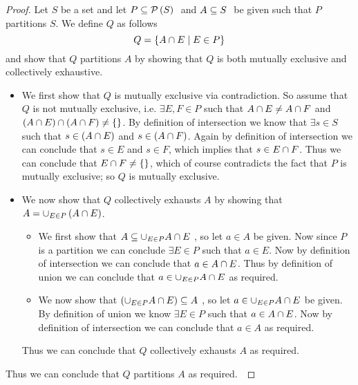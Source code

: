         \begin{proof}
            Let $S$ be a set and let $P \subseteq \mathcal{P}\left(S\right) \ $ and $A \subseteq S \ $ be given such
            that $P$ partitions $S$. We define $Q$ as follows
            \[
                Q = \left\{A \cap E \mid E \in P\right\}
            \]
            and show that $Q$ partitions $A$ by showing that $Q$ is both mutually exclusive
            and collectively exhaustive.
            \begin{itemize}
                \item
                    We first show that $Q$ is mutually exclusive via contradiction.
                    So assume that $Q$ is not mutually exclusive, i.e. $\exists E, F \in P$
                    such that $A \cap E \neq A \cap F$ and 
                    $\left(A \cap E\right) \cap \left(A \cap F\right) \neq \left\{\right\}$.
                    By definition of intersection we know that $\exists s \in S$ such that
                    $s \in \left(A \cap E\right)$ and $s \in \left(A \cap F\right)$. Again by definition 
                    of intersection we can conclude that $s \in E$ and $s \in F$, which implies
                    that $s \in E \cap F$. Thus we can conclude that $E \cap F \neq \left\{\right\}$,
                    which of course contradicts the fact that $P$ is mutually exclusive; so $Q$
                    is mutually exclusive.
                \item
                    We now show that $Q$ collectively exhausts $A$ by showing that
                    $A = \cup_{E \in P} \left(A \cap E\right)$.
                    \begin{itemize}
                        \item
                            We first show that $A \subseteq \cup_{E \in P} A \cap E \ $, so let
                            $a \in A$ be given. Now since $P$ is a partition we can conclude
                            $\exists E \in P$ such that $a \in E$. Now by definition of intersection    
                            we can conclude that $a \in A \cap E$. Thus by definition of
                            union we can conclude that $a \in \cup_{E \in P} A \cap E$ as
                            required.
                        \item
                            We now show that $\left(\cup_{E \in P} A \cap E\right) \subseteq A \ $, so let
                            $a \in \cup_{E \in P} A \cap E$ be given. By definition of union
                            we know $\exists E \in P$ such that $a \in A \cap E$. Now by definition of 
                            intersection we can conclude that $a \in A$ as required.
                    \end{itemize}
                    Thus we can conclude that $Q$ collectively exhausts $A$ as required.
            \end{itemize}
            Thus we can conclude that $Q$ partitions $A$ as required.~\QED
        \end{proof}

